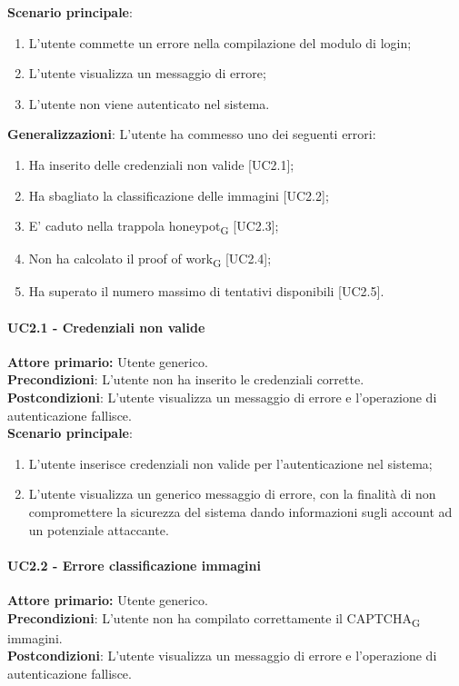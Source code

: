 \textbf{Scenario principale}:
\begin{enumerate}
   \item L’utente commette un errore nella compilazione del modulo di login;
   \item L'utente visualizza un messaggio di errore;
   \item L'utente non viene autenticato nel sistema.
\end{enumerate}

\textbf{Generalizzazioni}: L'utente ha commesso uno dei seguenti errori:
\begin{enumerate}
	\item Ha inserito delle credenziali non valide [UC2.1];
	\item Ha sbagliato la classificazione delle immagini [UC2.2];
	\item E' caduto nella trappola honeypot\textsubscript{G} [UC2.3];
	\item Non ha calcolato il proof of work\textsubscript{G} [UC2.4];
	\item Ha superato il numero massimo di tentativi disponibili [UC2.5].
\end{enumerate}

\paragraph{UC2.1 - Credenziali non valide}
\textbf{Attore primario:} Utente generico.\\
\textbf{Precondizioni}: L’utente non ha inserito le credenziali corrette.\\
\textbf{Postcondizioni}: L’utente visualizza un messaggio di errore e l’operazione di autenticazione fallisce.\\

\textbf{Scenario principale}:
\begin{enumerate}
    \item L'utente inserisce credenziali non valide per l'autenticazione nel sistema;
	\item L’utente visualizza un generico messaggio di errore, con la finalità di non compromettere la sicurezza del sistema dando informazioni sugli account ad un potenziale attaccante.
\end{enumerate}

\paragraph{UC2.2 - Errore classificazione immagini}
\textbf{Attore primario:} Utente generico.\\
    \textbf{Precondizioni}: L’utente non ha compilato correttamente il CAPTCHA\textsubscript{G} immagini.\\
\textbf{Postcondizioni}: L’utente visualizza un messaggio di errore e l’operazione di autenticazione fallisce.\\

